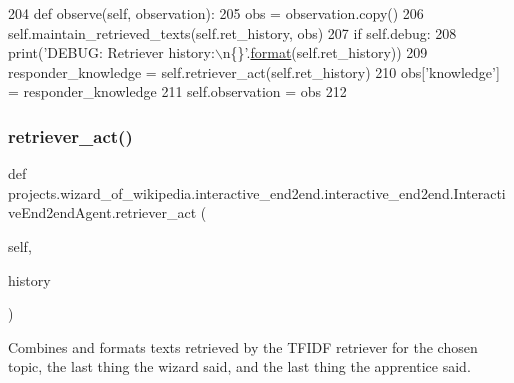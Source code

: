 \begin{DoxyCode}
204     \textcolor{keyword}{def }observe(self, observation):
205         obs = observation.copy()
206         self.maintain\_retrieved\_texts(self.ret\_history, obs)
207         \textcolor{keywordflow}{if} self.debug:
208             print(\textcolor{stringliteral}{'DEBUG: Retriever history:\(\backslash\)n\{\}'}.\hyperlink{namespaceparlai_1_1chat__service_1_1services_1_1messenger_1_1shared__utils_a32e2e2022b824fbaf80c747160b52a76}{format}(self.ret\_history))
209         responder\_knowledge = self.retriever\_act(self.ret\_history)
210         obs[\textcolor{stringliteral}{'knowledge'}] = responder\_knowledge
211         self.observation = obs
212 
\end{DoxyCode}
\mbox{\label{classprojects_1_1wizard__of__wikipedia_1_1interactive__end2end_1_1interactive__end2end_1_1InteractiveEnd2endAgent_a52881f4f2dce45942df35999a7c1e39c}} 
\subsubsection{\texorpdfstring{retriever\+\_\+act()}{retriever\_act()}}
{\footnotesize\ttfamily def projects.\+wizard\+\_\+of\+\_\+wikipedia.\+interactive\+\_\+end2end.\+interactive\+\_\+end2end.\+Interactive\+End2end\+Agent.\+retriever\+\_\+act (\begin{DoxyParamCaption}\item[{}]{self,  }\item[{}]{history }\end{DoxyParamCaption})}

\begin{DoxyVerb}Combines and formats texts retrieved by the TFIDF retriever for the chosen
topic, the last thing the wizard said, and the last thing the apprentice said.
\end{DoxyVerb}
 

